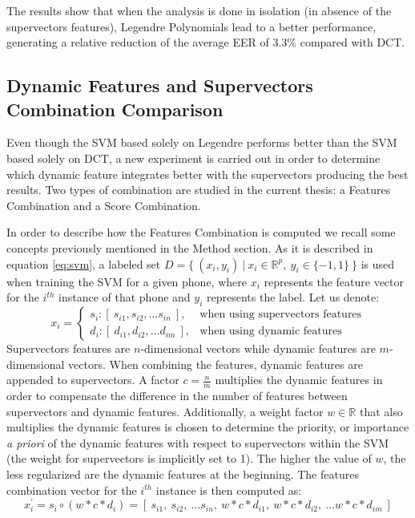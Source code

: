 The results show that when the analysis is done in isolation (in absence of the supervectors
features), Legendre Polynomials lead to a better performance, generating a relative reduction
of the average EER of 3.3\% compared with DCT.

\subsection{Dynamic Features and Supervectors Combination Comparison}

Even though the SVM based solely on Legendre performs better than the SVM based solely on
DCT, a new experiment is carried out in order to determine which
dynamic feature integrates better
with the supervectors producing the best results. Two types of combination are
studied in the current thesis: a Features Combination and a Score
Combination.

In order to describe how the Features Combination is computed we recall some
concepts previously mentioned in the Method section.
As it is described in equation \ref{eq:svm}, a labeled set
\mbox{$D=\{ \ (x_{i}, y_{i}) \ | \ x_{i} \in \mathbb{R}^{p}, \ y_{i} \in \{-1, 1\} \ \}$}
is used
when training the SVM for a given phone, where $x_{i}$ represents the feature vector for the
$i^{th}$ instance of that phone and $y_{i}$ represents the label.
Let us denote:
\begin{equation}
	x_{i} =
	\begin{cases}
		s_{i} : [ \ s_{i1}, s_{i2}, \dotsc s_{in} \ ], & \text{when using supervectors features} \\
		d_{i} : [ \ d_{i1}, d_{i2}, \dotsc d_{im} \ ], & \text{when using dynamic features}
	\end{cases}
\end{equation}
Supervectors features are $n$-dimensional vectors while dynamic features are $m$-dimensional
vectors. When combining the features, dynamic features are appended to supervectors.
A factor $c = \frac{n}{m}$ multiplies the dynamic features
in order to compensate the difference in
the number of features between supervectors and dynamic features.
Additionally, a weight factor $w \in \mathbb{R}$ that also multiplies the dynamic features
is chosen to determine
the priority, or importance \textit{a priori} of the dynamic features with respect to supervectors
within the SVM (the weight for supervectors is implicitly set to 1).
The higher the value of $w$, the less regularized are the dynamic features
at the beginning.
The features combination vector for the $i^{th}$ instance is then computed as:
\begin{equation}
	x_{i}^{\prime} = s_{i} \circ (w * c * d_{i}) = [ \ s_{i1}, \ s_{i2}, \ \dotsc s_{in}, \ w * c * d_{i1}, \ w * c * d_{i2}, \ \dotsc w * c * d_{im} \ ]
	\label{eq:featuresCombination}
\end{equation}

